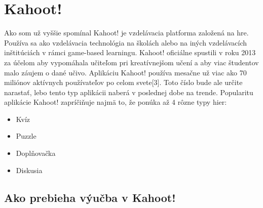 \documentclass[10pt,oneside,slovak,a4paper]{article}
\begin{document}
\section{Kahoot!} \label{ina}
Ako som už vyššie spomínal Kahoot! je vzdelávacia platforma založená na hre. Používa sa ako vzdelávacia technológia na školách alebo na iných vzdelávacích inštitúciách v rámci game-based learningu. Kahoot! oficiálne spustili v roku 2013 za účelom aby vypomáhala učiteľom pri kreatívnejšom učení a aby viac študentov malo záujem o dané učivo.  Aplikáciu Kahoot! používa mesačne už viac ako 70 miliónov aktívnych používateľov po celom svete[3]. Toto číslo bude ale určite narastať, lebo tento typ aplikácii naberá v poslednej dobe na trende.  Popularitu aplikácie Kahoot! zapríčiňuje najmä to, že ponúka až 4 rôzne typy hier:
\begin{itemize}
\item	Kvíz
\item	Puzzle
\item	Doplňovačka
\item	Diskusia


\end {itemize}
\subsection{Ako prebieha výučba v Kahoot!} \label{ina:nejake}
\end{document}
